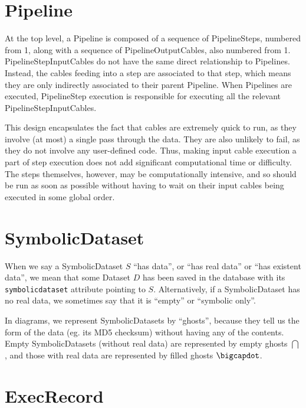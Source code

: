 \documentclass[12pt]{article}
\newcommand{\code}[1]{\texttt{#1}}
\newcommand{\sd}{\bigcap} %
\newcommand{\sdd}{\bigcapdot} %
\begin{document}
\def\nodedist{1}
\def\sep{0.2}

\section*{Pipeline}

At the top level, a Pipeline is composed of a sequence of PipelineSteps,
numbered from 1, along with a sequence of PipelineOutputCables, also numbered
from 1. PipelineStepInputCables do not have the same direct relationship to
Pipelines. Instead, the cables feeding into a step are associated to that step,
which means they are only indirectly associated to their parent Pipeline. When
Pipelines are executed, PipelineStep execution is responsible for executing all
the relevant PipelineStepInputCables.

This design encapsulates the fact that cables are extremely quick to run, as
they involve (at most) a single pass through the data. They are also unlikely
to fail, as they do not involve any user-defined code. Thus, making input cable
execution a part of step execution does not add significant computational time
or difficulty. The steps themselves, however, may be computationally intensive,
and so should be run as soon as possible without having to wait on their input
cables being executed in some global order.

\section*{SymbolicDataset}

When we say a SymbolicDataset $S$ ``has data'', or ``has real data'' or ``has
existent data'', we mean that some Dataset $D$ has been saved in the database
with its \code{symbolicdataset} attribute pointing to $S$. Alternatively, if a
SymbolicDataset has no real data, we sometimes say that it is ``empty'' or
``symbolic only''.

In diagrams, we represent SymbolicDatasets by ``ghosts'', because they tell us
the form of the data (eg. its MD5 checksum) without having any of the contents.
Empty SymbolicDatasets (without real data) are represented by empty ghosts
$\sd$, and those with real data are represented by filled ghosts $\sdd$.

\section*{ExecRecord}
\end{document}
